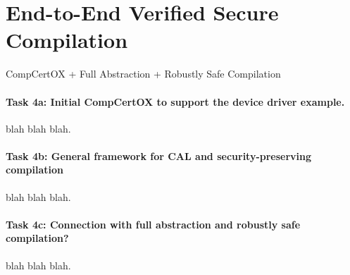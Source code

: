 \section{End-to-End Verified Secure Compilation}
\label{sec:compcertox}

CompCertOX + Full Abstraction + Robustly Safe Compilation


\paragraph*{Task 4a: Initial CompCertOX to support the device driver example.}
blah blah blah.

\paragraph*{Task 4b: General framework for CAL and security-preserving compilation}
blah blah blah.

\paragraph*{Task 4c: Connection with full abstraction and robustly safe compilation?} 
blah blah blah.
    
